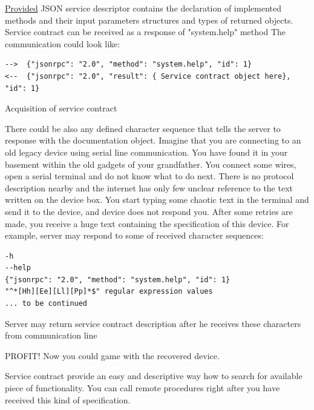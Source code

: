 \hyperref[lst:json_contract_example]{Provided} 
JSON service descriptor contains the declaration of implemented methods and their input parameters structures and types of returned objects.
Service contract can be received as a response of "system.help" method
The communication could look like:

\begin{listing}[H]
\begin{verbatim}
-->  {"jsonrpc": "2.0", "method": "system.help", "id": 1}
<--  {"jsonrpc": "2.0", "result": { Service contract object here}, "id": 1}
\end{verbatim}
\caption{Acquisition of service contract}
\label{lst:service_contract_acquisition}
\end{listing}

There could be also any defined character sequence that tells the server to response with the documentation object.
Imagine that you are connecting to an old legacy device using serial line communication.
You have found it in your basement within the old gadgets of your  grandfather. 
You connect some wires, open a serial terminal and do not know what to do next.
There is no protocol description nearby and the internet has only few unclear reference to the text written on the device box.
You start typing some chaotic text in the terminal and  send it to the device, and device does not respond you.
After some retries are made, you receive a huge text containing the specification of this device.
For example, server may respond to some of received character sequences:
\begin{listing}[H]
\begin{verbatim}
-h
--help
{"jsonrpc": "2.0", "method": "system.help", "id": 1}
"^*[Hh][Ee][Ll][Pp]*$" regular expression values
... to be continued
\end{verbatim}
\caption{Server may return service contract description after he receives these characters from communication line}
\label{lst:server_help_return}
\end{listing}


PROFIT! Now you could game with the recovered device.

Service contract provide an easy and descriptive way how to search for available piece of functionality.
You can call remote procedures right after you have received this kind of specification. 

